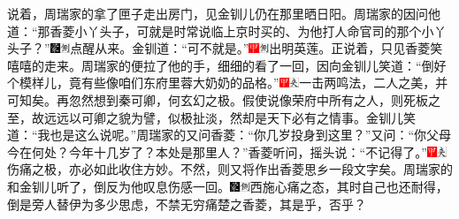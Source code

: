 说着，周瑞家的拿了匣子走出房门，见金钏儿仍在那里晒日阳。周瑞家的因问他道：“那香菱小丫头子，可就是时常说临上京时买的、为他打人命官司的那个小丫头子？”{\includegraphics[width=3mm]{../Images/00006}\includegraphics[width=3mm]{../Images/00011}\footnotesize \kaishu 点醒从来。}金钏道：“可不就是。”{\includegraphics[width=3mm]{../Images/00002}\includegraphics[width=3mm]{../Images/00011}\footnotesize \kaishu 出明英莲。}正说着，只见香菱笑嘻嘻的走来。周瑞家的便拉了他的手，细细的看了一回，因向金钏儿笑道：“倒好个模样儿，竟有些像咱们东府里蓉大奶奶的品格。”{\includegraphics[width=3mm]{../Images/00002}\includegraphics[width=3mm]{../Images/00012}\footnotesize \kaishu 一击两鸣法，二人之美，并可知矣。再忽然想到秦可卿，何玄幻之极。假使说像荣府中所有之人，则死板之至，故远远以可卿之貌为譬，似极扯淡，然却是天下必有之情事。}金钏儿笑道：“我也是这么说呢。”周瑞家的又问香菱：“你几岁投身到这里？”又问：“你父母今在何处？今年十几岁了？本处是那里人？”香菱听问，摇头说：“不记得了。”{\includegraphics[width=3mm]{../Images/00002}\includegraphics[width=3mm]{../Images/00012}\footnotesize \kaishu 伤痛之极，亦必如此收住方妙。不然，则又将作出香菱思乡一段文字矣。}周瑞家的和金钏儿听了，倒反为他叹息伤感一回。{\includegraphics[width=3mm]{../Images/00006}\includegraphics[width=3mm]{../Images/00011}\footnotesize \kaishu 西施心痛之态，其时自己也还耐得，倒是旁人替伊为多少思虑，不禁无穷痛楚之香菱，其是乎，否乎？}

